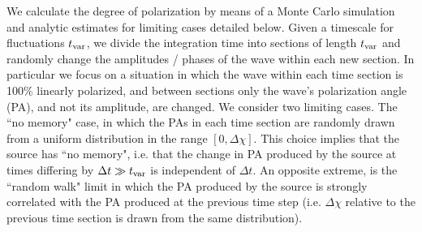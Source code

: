 \documentclass[fleqn,usenatbib]{mnras}
\begin{document}
	We calculate the degree of polarization by means of a Monte Carlo simulation and analytic estimates for limiting cases detailed below. Given a timescale for fluctuations $t_{\rm var}$, we divide the integration time into sections of length $t_{\rm var}$ and randomly change the amplitudes / phases of the wave within each new section. In particular we focus on a situation in which the wave within each time section is 100\% linearly polarized, and between sections only the wave's polarization angle (PA), and not its amplitude, are changed.
	We consider two limiting cases. The ``no memory" case, in which 
	the PAs in each time section are randomly drawn from a uniform distribution in the range $[0,\Delta \chi]$.  This choice implies that the source has ``no memory", i.e. that the change in PA produced by the source at times differing by $\Delta t\gg t_{\rm var}$ is independent of $\Delta t$. An opposite extreme, is the ``random walk" limit in which the PA produced by the source is strongly correlated with the PA produced at the previous time step (i.e. $\Delta \chi$ relative to the previous time section is drawn from the same distribution). 
	
\end{document}
